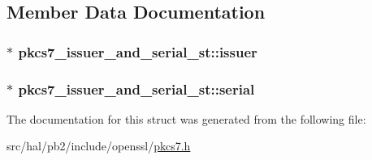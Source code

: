 \subsection{Member Data Documentation}
\subsubsection[{\texorpdfstring{issuer}{issuer}}]{$\ast$ pkcs7\+\_\+issuer\+\_\+and\+\_\+serial\+\_\+st\+::issuer}\hypertarget{structpkcs7__issuer__and__serial__st_ace9f7a526b2d91328ce37a1b3d26c179}{}\label{structpkcs7__issuer__and__serial__st_ace9f7a526b2d91328ce37a1b3d26c179}
\subsubsection[{\texorpdfstring{serial}{serial}}]{$\ast$ pkcs7\+\_\+issuer\+\_\+and\+\_\+serial\+\_\+st\+::serial}\hypertarget{structpkcs7__issuer__and__serial__st_a46903221f3f9a3a0243bbaae23afbe98}{}\label{structpkcs7__issuer__and__serial__st_a46903221f3f9a3a0243bbaae23afbe98}


The documentation for this struct was generated from the following file\+:\begin{DoxyCompactItemize}
\item 
src/hal/pb2/include/openssl/\hyperlink{pkcs7_8h}{pkcs7.\+h}\end{DoxyCompactItemize}
